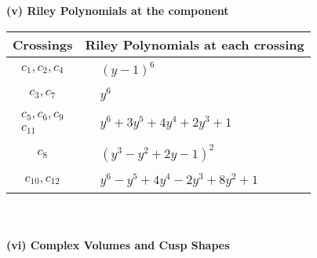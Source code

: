 \documentclass[1p]{elsarticle_modified}
\theoremstyle{definition}
\begin{document}
\newpage\renewcommand{\arraystretch}{1}
\flushleft \textbf{(v) Riley Polynomials at the component}\newline \\
\begin{tabular}{m{50pt}|m{274pt}}
Crossings & \hspace{64pt}Riley Polynomials at each crossing \\
\hline $$\begin{aligned}c_{1},c_{2},c_{4}\end{aligned}$$&$\begin{aligned}
&(y-1)^6
\end{aligned}$\\
\hline $$\begin{aligned}c_{3},c_{7}\end{aligned}$$&$\begin{aligned}
&y^6
\end{aligned}$\\
\hline $$\begin{aligned}c_{5},c_{6},c_{9}\\c_{11}\end{aligned}$$&$\begin{aligned}
&y^6+3 y^5+4 y^4+2 y^3+1
\end{aligned}$\\
\hline $$\begin{aligned}c_{8}\end{aligned}$$&$\begin{aligned}
&(y^3- y^2+2 y-1)^2
\end{aligned}$\\
\hline $$\begin{aligned}c_{10},c_{12}\end{aligned}$$&$\begin{aligned}
&y^6- y^5+4 y^4-2 y^3+8 y^2+1
\end{aligned}$\\
\hline
\end{tabular}\\~\\
\newpage\flushleft \textbf{(vi) Complex Volumes and Cusp Shapes}
\end{document}
